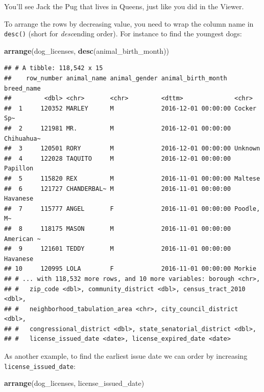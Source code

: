 \documentclass[]{Nemilov}
\newenvironment{Shaded}{\begin{snugshade}}{\end{snugshade}}
\newcommand{\KeywordTok}[1]{\textcolor[rgb]{0.13,0.29,0.53}{\textbf{#1}}}
\newcommand{\NormalTok}[1]{#1}
\begin{document}
You'll see Jack the Pug that lives in Queens, just like you did in the Viewer.

To arrange the rows by decreasing value, you need to wrap the column name in \texttt{desc()} (short for \emph{desc}ending order). For instance to find the youngest dogs:

\begin{Shaded}
\begin{Highlighting}[]
\KeywordTok{arrange}\NormalTok{(dog_licenses, }\KeywordTok{desc}\NormalTok{(animal_birth_month))}
\end{Highlighting}
\end{Shaded}

\begin{verbatim}
## # A tibble: 118,542 x 15
##    row_number animal_name animal_gender animal_birth_month  breed_name
##         <dbl> <chr>       <chr>         <dttm>              <chr>     
##  1     120352 MARLEY      M             2016-12-01 00:00:00 Cocker Sp~
##  2     121981 MR.         M             2016-12-01 00:00:00 Chihuahua~
##  3     120501 RORY        M             2016-12-01 00:00:00 Unknown   
##  4     122028 TAQUITO     M             2016-12-01 00:00:00 Papillon  
##  5     115820 REX         M             2016-11-01 00:00:00 Maltese   
##  6     121727 CHANDERBAL~ M             2016-11-01 00:00:00 Havanese  
##  7     115777 ANGEL       F             2016-11-01 00:00:00 Poodle, M~
##  8     118175 MASON       M             2016-11-01 00:00:00 American ~
##  9     121601 TEDDY       M             2016-11-01 00:00:00 Havanese  
## 10     120995 LOLA        F             2016-11-01 00:00:00 Morkie    
## # ... with 118,532 more rows, and 10 more variables: borough <chr>,
## #   zip_code <dbl>, community_district <dbl>, census_tract_2010 <dbl>,
## #   neighborhood_tabulation_area <chr>, city_council_district <dbl>,
## #   congressional_district <dbl>, state_senatorial_district <dbl>,
## #   license_issued_date <date>, license_expired_date <date>
\end{verbatim}

As another example, to find the earliest issue date we can order by increasing \texttt{license\_issued\_date}:

\begin{Shaded}
\begin{Highlighting}[]
\KeywordTok{arrange}\NormalTok{(dog_licenses, license_issued_date)}
\end{Highlighting}
\end{Shaded}
\end{document}
